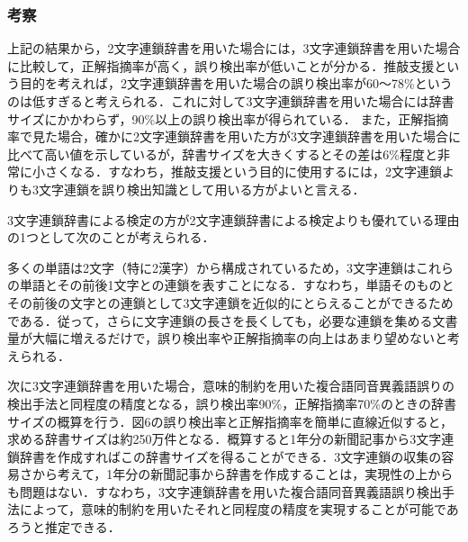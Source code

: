 \begin{figure}[htbp]
\begin{center}
\end{center}
\vspace{-4mm}
\end{figure}



\subsubsection{考察}

\smallskip
\indent
上記の結果から，2文字連鎖辞書を用いた場合には，3文字連鎖辞書を用いた場合に比較して，正解指摘率が高く，誤り検出率が低いことが分かる．推敲支援という目的を考えれば，2文字連鎖辞書を用いた場合の誤り検出率が60〜78\%というのは低すぎると考えられる．これに対して3文字連鎖辞書を用いた場合には辞書サイズにかかわらず，90\%以上の誤り検出率が得られている．
また，正解指摘率で見た場合，確かに2文字連鎖辞書を用いた方が3文字連鎖辞書を用いた場合に比べて高い値を示しているが，辞書サイズを大きくするとその差は6\%程度と非常に小さくなる．すなわち，推敲支援という目的に使用するには，2文字連鎖よりも3文字連鎖を誤り検出知識として用いる方がよいと言える．

\begin{figure}
\begin{center}
\end{center}
\vspace*{-2mm}
\end{figure}

\begin{figure}
\begin{center}
\end{center}
\end{figure}

3文字連鎖辞書による検定の方が2文字連鎖辞書による検定よりも優れている理由の1つとして次のことが考えられる．

多くの単語は2文字（特に2漢字）から構成されているため，3文字連鎖はこれらの単語とその前後1文字との連鎖を表すことになる．すなわち，単語そのものとその前後の文字との連鎖として3文字連鎖を近似的にとらえることができるためである．従って，さらに文字連鎖の長さを長くしても，必要な連鎖を集める文書量が大幅に増えるだけで，誤り検出率や正解指摘率の向上はあまり望めないと考えられる．

次に3文字連鎖辞書を用いた場合，意味的制約を用いた複合語同音異義語誤りの検出手法と同程度の精度となる，誤り検出率90\%，正解指摘率70\%のときの辞書サイズの概算を行う．図6の誤り検出率と正解指摘率を簡単に直線近似すると，求める辞書サイズは約250万件となる．概算すると1年分の新聞記事から3文字連鎖辞書を作成すればこの辞書サイズを得ることができる．3文字連鎖の収集の容易さから考えて，1年分の新聞記事から辞書を作成することは，実現性の上からも問題はない．すなわち，3文字連鎖辞書を用いた複合語同音異義語誤り検出手法によって，意味的制約を用いたそれと同程度の精度を実現することが可能であろうと推定できる．

